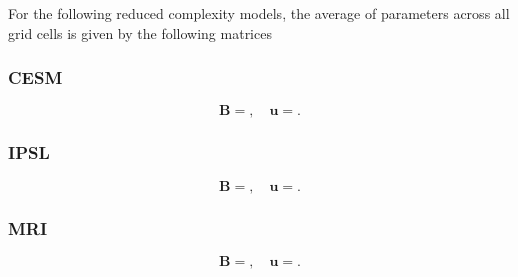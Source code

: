 \documentclass[draft,linenumbers]{agujournal}
\begin{document}
For the following reduced complexity models, the average of parameters across all grid cells is given by the following matrices

\subsubsection*{CESM}
\begin{equation}
\mathbf{B} =
,
\quad {\bm u} =
.
\end{equation}

\subsubsection*{IPSL}
\begin{equation}
\mathbf{B} =
,
\quad {\bm u} =
.
\end{equation}

\subsubsection*{MRI}
\begin{equation}
\mathbf{B} =
,
\quad {\bm u} =
.
\end{equation}
\end{document}
